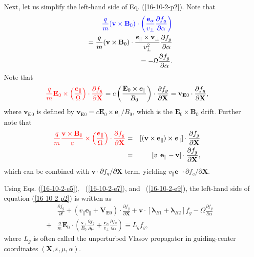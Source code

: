 \documentclass{llncs}
\newcommand{\tmcolor}[2]{{\color{#1}{#2}}}
\newcommand{\tmmathbf}[1]{\ensuremath{\boldsymbol{#1}}}
\begin{document}
Next, let us simplify the left-hand side of Eq. (\ref{16-10-2-p2}). Note that
\begin{eqnarray}
  &  & \tmcolor{blue}{\frac{q}{m}  (\mathbf{v} \times \mathbf{B}_0) \cdot
  \left( \frac{\mathbf{e}_{\alpha}}{v_{\perp}}  \frac{\partial f_g}{\partial
  \alpha} \right)} \nonumber\\
  &  & = \frac{q}{m}  (\mathbf{v} \times \mathbf{B}_0) \cdot
  \frac{\tmmathbf{e}_{\parallel} \times \mathbf{v}_{\perp}}{v_{\perp}^2} 
  \frac{\partial f_g}{\partial \alpha} \nonumber\\
  &  & = - \Omega \frac{\partial f_g}{\partial \alpha} .  \label{16-10-2-e9}
\end{eqnarray}
Note that
\begin{equation}
  \label{16-10-2-e5} \tmcolor{red}{\frac{q}{m} \mathbf{E}_0 \times \left(
  \frac{\tmmathbf{e}_{\parallel}}{\Omega}  \right) \cdot \frac{\partial
  f_g}{\partial \mathbf{X}}} = c \left( \frac{\mathbf{E}_0 \times
  \tmmathbf{e}_{\parallel}}{B_0}  \right) \cdot \frac{\partial f_g}{\partial
  \mathbf{X}} =\mathbf{v}_{\mathbf{E}0} \cdot \frac{\partial f_g}{\partial
  \mathbf{X}},
\end{equation}
where $\mathbf{v}_{\mathbf{E}0}$ is defined by $\mathbf{v}_{\mathbf{E}0} =
c\mathbf{E}_0 \times \mathbf{e}_{\parallel} / B_0$, which is the $\mathbf{E}_0
\times \mathbf{B}_0$ drift. Further note that
\begin{eqnarray}
  \tmcolor{red}{\frac{q}{m}  \frac{\mathbf{v} \times \mathbf{B}_0}{c} \times
  \left( \frac{\tmmathbf{e}_{\parallel}}{\Omega}  \right) \cdot \frac{\partial
  f_g}{\partial \mathbf{X}}} & = & [(\mathbf{v} \times \mathbf{e}_{\parallel})
  \times \tmmathbf{e}_{\parallel}] \cdot \frac{\partial f_g}{\partial
  \mathbf{X}} \nonumber\\
  & = & [v_{\parallel} \mathbf{e}_{\parallel} -\mathbf{v}] \cdot
  \frac{\partial f_g}{\partial \mathbf{X}},  \label{16-10-2-e7}
\end{eqnarray}
which can be combined with $\mathbf{v} \cdot \partial f_g / \partial
\mathbf{X}$ term, yielding $v_{\parallel} \mathbf{e}_{\parallel} \cdot
\partial f_g / \partial \mathbf{X}$.

Using Eqs. (\ref{16-10-2-e5}), \ (\ref{16-10-2-e7}), and \
(\ref{16-10-2-e9}), the left-hand side of equation (\ref{16-10-2-p2}) is
written as
\begin{eqnarray}
  &  & \frac{\partial f_g}{\partial t} + (v_{\parallel}
  \mathbf{e}_{\parallel} +\mathbf{V}_{\mathbf{E}0}) \cdot \frac{\partial
  f_g}{\partial \mathbf{X}} +\mathbf{v} \cdot [\tmmathbf{\lambda}_{B 1}
  +\tmmathbf{\lambda}_{B 2}] f_g - \Omega \frac{\partial f_g}{\partial \alpha}
  \nonumber\\
  & + & \frac{q}{m} \mathbf{E}_0 \cdot \left( \frac{\mathbf{v}_{\perp}}{B_0} 
  \frac{\partial f_g}{\partial \mu} + \frac{\tmmathbf{e}_{\alpha}}{v_{\perp}} 
  \frac{\partial f_g}{\partial \alpha} \right) \equiv L_g f_g, 
  \label{16-9-22-1b}
\end{eqnarray}
where $L_g$ is often called the unperturbed Vlasov propagator in
guiding-center coordinates $(\mathbf{X}, \varepsilon, \mu, \alpha)$.
\end{document}
